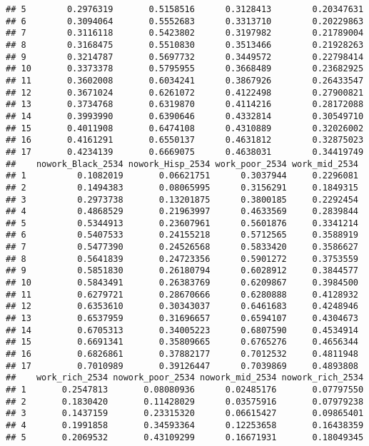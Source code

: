 \documentclass[
]{article}
\begin{document}
\begin{verbatim}
## 5        0.2976319       0.5158516      0.3128413        0.20347631
## 6        0.3094064       0.5552683      0.3313710        0.20229863
## 7        0.3116118       0.5423802      0.3197982        0.21789004
## 8        0.3168475       0.5510830      0.3513466        0.21928263
## 9        0.3214787       0.5697732      0.3449572        0.22798414
## 10       0.3373378       0.5795955      0.3668489        0.23682925
## 11       0.3602008       0.6034241      0.3867926        0.26433547
## 12       0.3671024       0.6261072      0.4122498        0.27900821
## 13       0.3734768       0.6319870      0.4114216        0.28172088
## 14       0.3993990       0.6390646      0.4332814        0.30549710
## 15       0.4011908       0.6474108      0.4310889        0.32026002
## 16       0.4161291       0.6550137      0.4631812        0.32875023
## 17       0.4234139       0.6669075      0.4638031        0.34419749
##    nowork_Black_2534 nowork_Hisp_2534 work_poor_2534 work_mid_2534
## 1          0.1082019       0.06621751      0.3037944     0.2296081
## 2          0.1494383       0.08065995      0.3156291     0.1849315
## 3          0.2973738       0.13201875      0.3800185     0.2292454
## 4          0.4868529       0.21963997      0.4633569     0.2839844
## 5          0.5344913       0.23607961      0.5601876     0.3341214
## 6          0.5407533       0.24155218      0.5712565     0.3588919
## 7          0.5477390       0.24526568      0.5833420     0.3586627
## 8          0.5641839       0.24723356      0.5901272     0.3753559
## 9          0.5851830       0.26180794      0.6028912     0.3844577
## 10         0.5843491       0.26383769      0.6209867     0.3984500
## 11         0.6279721       0.28670666      0.6280888     0.4128932
## 12         0.6353610       0.30343037      0.6461683     0.4248946
## 13         0.6537959       0.31696657      0.6594107     0.4304673
## 14         0.6705313       0.34005223      0.6807590     0.4534914
## 15         0.6691341       0.35809665      0.6765276     0.4656344
## 16         0.6826861       0.37882177      0.7012532     0.4811948
## 17         0.7010989       0.39126447      0.7039869     0.4893808
##    work_rich_2534 nowork_poor_2534 nowork_mid_2534 nowork_rich_2534
## 1       0.2547813       0.08080936      0.02485176       0.07797550
## 2       0.1830420       0.11428029      0.03575916       0.07979238
## 3       0.1437159       0.23315320      0.06615427       0.09865401
## 4       0.1991858       0.34593364      0.12253658       0.16438359
## 5       0.2069532       0.43109299      0.16671931       0.18049345

\end{verbatim}
\end{document}
